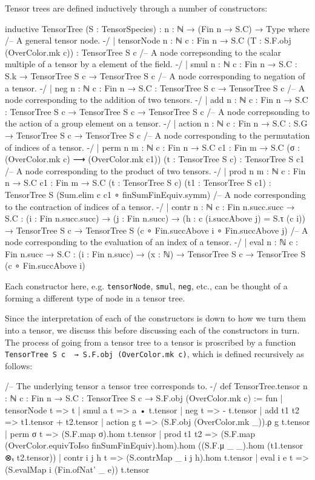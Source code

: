 \documentclass[a4paper, 11pt]{article}
\begin{document}
Tensor trees are defined inductively through a number of constructors: 
\begin{codeLong}
inductive TensorTree (S : TensorSpecies) : {n : ℕ} → (Fin n → S.C) → Type where
  /-- A general tensor node. -/
  | tensorNode {n : ℕ} {c : Fin n → S.C} (T : S.F.obj (OverColor.mk c)) : TensorTree S c
  /-- A node correpsonding to the scalar multiple of a tensor by a element of the field. -/
  | smul {n : ℕ} {c : Fin n → S.C} : S.k → TensorTree S c → TensorTree S c
  /-- A node corresponding to negation of a tensor. -/
  | neg {n : ℕ} {c : Fin n → S.C} : TensorTree S c → TensorTree S c
  /-- A node corresponding to the addition of two tensors. -/
  | add {n : ℕ} {c : Fin n → S.C} : TensorTree S c → TensorTree S c → TensorTree S c
  /-- A node correpsonding to the action of a group element on a tensor. -/
  | action {n : ℕ} {c : Fin n → S.C} : S.G → TensorTree S c → TensorTree S c
  /-- A node corresponding to the permutation of indices of a tensor. -/
  | perm {n m : ℕ} {c : Fin n → S.C} {c1 : Fin m → S.C}
      (σ : (OverColor.mk c) ⟶ (OverColor.mk c1)) (t : TensorTree S c) : TensorTree S c1
  /-- A node corresponding to the product of two tensors. -/
  | prod {n m : ℕ} {c : Fin n → S.C} {c1 : Fin m → S.C}
    (t : TensorTree S c) (t1 : TensorTree S c1) : TensorTree S (Sum.elim c c1 ∘ finSumFinEquiv.symm)
  /-- A node corresponding to the contraction of indices of a tensor. -/
  | contr {n : ℕ} {c : Fin n.succ.succ → S.C} : (i : Fin n.succ.succ) →
    (j : Fin n.succ) → (h : c (i.succAbove j) = S.τ (c i)) → TensorTree S c →
    TensorTree S (c ∘ Fin.succAbove i ∘ Fin.succAbove j)
  /-- A node corresponding to the evaluation of an index of a tensor. -/
  | eval {n : ℕ} {c : Fin n.succ → S.C} : (i : Fin n.succ) → (x : ℕ) → TensorTree S c →
    TensorTree S (c ∘ Fin.succAbove i)
\end{codeLong}
Each constructor here, e.g. \lstinline|tensorNode|, \lstinline|smul|, \lstinline|neg|, etc., can 
be thought of a forming a different type of node in a tensor tree.

Since the interpretation of each of the constructors is down to how we turn them into a tensor,
we discuss this before discussing each of the constructors in turn. The process 
of going from a tensor tree to a tensor is proscribed by a function
\lstinline|TensorTree S c  → S.F.obj (OverColor.mk c)|, which is defined recursively as follows: 
\begin{code}
/-- The underlying tensor a tensor tree corresponds to. -/
def TensorTree.tensor {n : ℕ} {c : Fin n → S.C} : TensorTree S c → S.F.obj (OverColor.mk c) := fun
  | tensorNode t => t
  | smul a t => a • t.tensor
  | neg t => - t.tensor
  | add t1 t2 => t1.tensor + t2.tensor
  | action g t => (S.F.obj (OverColor.mk _)).ρ g t.tensor
  | perm σ t => (S.F.map σ).hom t.tensor
  | prod t1 t2 => (S.F.map (OverColor.equivToIso finSumFinEquiv).hom).hom
    ((S.F.μ _ _).hom (t1.tensor ⊗ₜ t2.tensor))
  | contr i j h t => (S.contrMap _ i j h).hom t.tensor
  | eval i e t => (S.evalMap i (Fin.ofNat' _ e)) t.tensor
\end{code}
\end{document}
